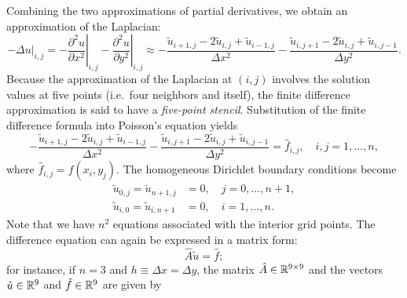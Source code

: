 Combining the two approximations of partial derivatives, we obtain an approximation of the Laplacian:
\[-\Delta u|_{i,j} = -\left.\frac{\partial^2 u}{\partial x^2}\right|_{i,j} - \left.\frac{\partial^2 u}{\partial y^2}\right|_{i,j} \approx -\frac{\tilde{u}_{i+1,j} - 2\tilde{u}_{i,j} + \tilde{u}_{i-1,j}}{\Delta x^2} - \frac{\tilde{u}_{i,j+1} - 2\tilde{u}_{i,j} + \tilde{u}_{i,j-1}}{\Delta y^2}.\]
Because the approximation of the Laplacian at $(i, j)$ involves the solution values at five points (i.e.\ four neighbors and itself), the finite difference approximation is said to have a \textit{five-point stencil}. Substitution of the finite difference formula into Poisson's equation yields
\begin{equation*}
    -\frac{\tilde{u}_{i+1,j} - 2\tilde{u}_{i,j} + \tilde{u}_{i-1,j}}{\Delta x^2} - \frac{\tilde{u}_{i,j+1} - 2\tilde{u}_{i,j} + \tilde{u}_{i,j-1}}{\Delta y^2} = \hat{f}_{i,j}, \quad i, j = 1, \dots, n, \tag{12.1}
\end{equation*}
where $\hat{f}_{i,j} = f(x_i, y_j)$. The homogeneous Dirichlet boundary conditions become
\begin{align*}
    \tilde{u}_{0,j} = \tilde{u}_{n+1,j} &= 0, \quad j = 0, \dots, n + 1, \\
    \tilde{u}_{i,0} = \tilde{u}_{i,n+1} &= 0, \quad i = 1, \dots, n.
\end{align*}
Note that we have $n^2$ equations associated with the interior grid points. The difference equation can again be expressed in a matrix form:
\[\hat{A}\tilde{u} = \hat{f};\]
for instance, if $n = 3$ and $h \equiv \Delta x = \Delta y$, the matrix $\hat{A} \in \mathbb{R}^{9 \times 9}$ and the vectors $\tilde{u} \in \mathbb{R}^9$ and $\hat{f} \in \mathbb{R}^9$ are given by
